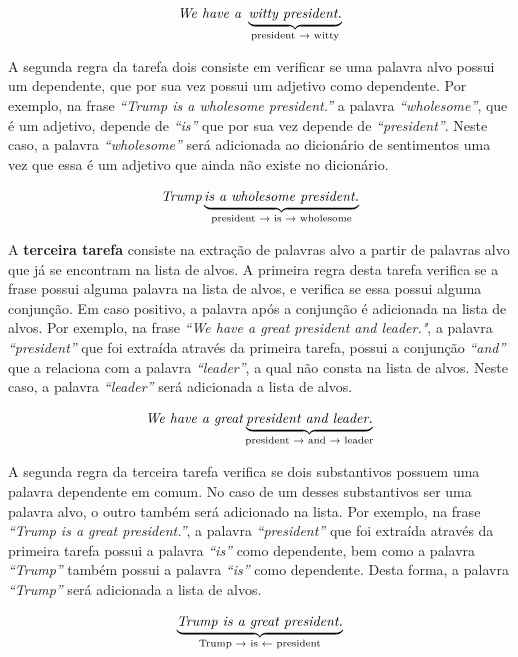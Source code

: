 \[\textit{We have a } \underbrace{\textit{witty president.}}_\text{president
\textrightarrow \text{ witty}}\]

A segunda regra da tarefa dois
consiste em verificar se uma palavra alvo possui um dependente, que por sua vez
possui um adjetivo como dependente. Por exemplo, na frase
\textit{``Trump is a wholesome president.''} a palavra \textit{``wholesome''}, que é um
adjetivo, depende de \textit{``is''} que por sua vez depende de
\textit{``president''}. Neste caso, a palavra \textit{``wholesome''}
será adicionada ao dicionário de sentimentos uma vez que essa é um adjetivo que
ainda não existe no dicionário.

\[\textit{Trump} \underbrace{\textit{is a wholesome president.}}_\text{president
\textrightarrow \text{ is} \textrightarrow \text{ wholesome}}\]

A \textbf{terceira tarefa} consiste na extração de palavras alvo a partir de
palavras alvo que já se encontram na lista de alvos. A primeira regra desta
tarefa verifica se a frase possui alguma palavra na lista de alvos, e verifica se essa possui alguma
conjunção. Em caso positivo, a palavra após a conjunção é adicionada na lista
de alvos. Por exemplo, na frase \textit{``We have a great president and
leader."}, a palavra \textit{``president''} que foi extraída através
da primeira tarefa, possui a conjunção \textit{``and''} que a relaciona com a
palavra \textit{``leader''}, a qual não consta na lista de alvos. Neste
caso, a palavra \textit{``leader''} será adicionada a lista de alvos.


\[\textit{We have a great} \underbrace{\textit{president and
leader.}}_\text{president \textrightarrow \text{ and} \textrightarrow \text{
leader}}\]

A segunda regra da terceira tarefa verifica se dois substantivos
possuem uma palavra dependente em comum. No caso de um desses substantivos ser
uma palavra alvo, o outro também será adicionado na lista. Por exemplo, na frase
\textit{``Trump is a great president.''}, a palavra \textit{``president''} que
foi extraída através da primeira tarefa possui a palavra \textit{``is''} como
dependente, bem como a palavra \textit{``Trump''} também possui a palavra
\textit{``is''} como dependente. Desta forma, a palavra \textit{``Trump''} será adicionada a
lista de alvos.

\[\underbrace{\textit{Trump is a great president.}}_\text{Trump
\textrightarrow \text{ is} \textleftarrow \text{ president}}\]



